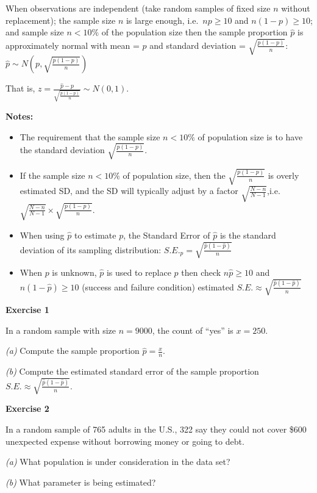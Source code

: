 \documentclass[
]{book}
\begin{document}
When observations are independent (take random samples of fixed size \(n\) without replacement); the sample size \(n\) is large enough, i.e.~\(np \geq 10\) and \(n(1-p) \geq 10\); and sample size \(n < 10\%\) of the population size then the sample proportion \(\hat{p}\) is approximately normal with mean = \(p\) and standard deviation = \(\sqrt{\frac{p(1-p)}{n}}\): \(\hat{p} \sim N(p, \sqrt{\frac{p(1-p)}{n}})\)

That is, \(z = \frac{\hat{p} - p}{\sqrt{\frac{p(1-p)}{n}}} \sim N(0, 1)\).

\textbf{Notes:}

\begin{itemize}
\item
  The requirement that the sample size \(n < 10\%\) of population size is to have the standard deviation \(\sqrt{\frac{p(1-p)}{n}}\).
\item
  If the sample size \(n < 10\%\) of population size, then the \(\sqrt{\frac{p(1-p)}{n}}\) is overly estimated SD, and the SD will typically adjust by a factor \(\sqrt{\frac{N-n}{N-1}}\),i.e.~\(\sqrt{\frac{N-n}{N-1}} \times \sqrt{\frac{p(1-p)}{n}}\).
\item
  When using \(\hat{p}\) to estimate \(p\), the Standard Error of \(\hat{p}\) is the standard deviation of its sampling distribution: \(S.E._{\hat{p}} = \sqrt{\frac{\hat{p}(1-\hat{p})}{n}}\)
\item
  When \(p\) is unknown, \(\hat{p}\) is used to replace \(p\) then check \(n\hat{p} \geq 10\) and \(n(1-\hat{p}) \geq 10\) (success and failure condition) estimated \(S.E. \approx \sqrt{\frac{\hat{p}(1-\hat{p})}{n}}\)
\end{itemize}

\textbf{Exercise 1}

In a random sample with size \(n=9000\), the count of ``yes'' is \(x=250\).

\emph{(a)} Compute the sample proportion \(\hat{p} = \frac{x}{n}\).

\emph{(b)} Compute the estimated standard error of the sample proportion \(S.E. \approx \sqrt{\frac{\hat{p}(1-\hat{p})}{n}}\).

\textbf{Exercise 2}

In a random sample of 765 adults in the U.S., 322 say they could not cover \$600 unexpected expense without borrowing money or going to debt.

\emph{(a)} What population is under consideration in the data set?

\emph{(b)} What parameter is being estimated?
\end{document}
